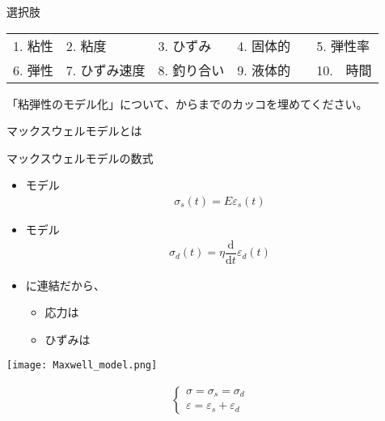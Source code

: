 \documentclass[uplatex,dvipdfmx,a4paper,11pt]{jsreport}
\begin{document}
\begin{qlist}
\begin{qlist2}
		\end{qlist2}

		\begin{itembox}[l]{選択肢}
			\begin{center}
				\begin{tabular}{lllll}
					1. 粘性	&2. 粘度	&3. ひずみ	&4. 固体的	&5. 弾性率\\
					6. 弾性	&7. ひずみ速度		&8. 釣り合い	&9. 液体的　&10.　時間
				\end{tabular}
			\end{center}
		\end{itembox}
\end{qlist}

\begin{qlist}
	\qitem 「粘弾性のモデル化」について、からまでのカッコを埋めてください。
		\vspace{5mm}
		\begin{qlist2}
			\qitem マックスウェルモデルとは
			\begin{center}
				\begin{minipage}{0.4\textwidth}
					\begin{itembox}[l]{マックスウェルモデルの数式}
						\begin{itemize}
							\item \qbox{}モデル
							\begin{align*}
								\sigma_s(t) = E \varepsilon_s(t)
							\end{align*}
							\item \qbox{}モデル
							\begin{align*}
								\sigma_d(t) = \eta \dfrac{\mathrm{d}}{\mathrm{d}t}\varepsilon_d(t)
							\end{align*}
							\item \qbox{}に連結だから、
							\begin{itemize}
								\item 応力は\qbox{}
							\item ひずみは\qbox{}
							\end{itemize}
						\end{itemize}	
					\end{itembox}
				\end{minipage}
				\begin{minipage}{0.45\textwidth}
					\begin{center}
					\texttt{[image: Maxwell\_model.png]}
					\end{center}
					\begin{align*}
						\begin{cases}
							\sigma = \sigma_s = \sigma_d \\
							\varepsilon = \varepsilon_s + \varepsilon_d
						\end{cases}
					\end{align*}
				\end{minipage}
			\end{center}


\end{qlist2}
\end{qlist}
\end{document}
